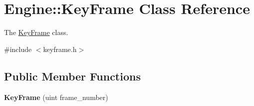 \hypertarget{classEngine_1_1KeyFrame}{}\section{Engine\+:\+:Key\+Frame Class Reference}
\label{classEngine_1_1KeyFrame}


The \hyperlink{classEngine_1_1KeyFrame}{Key\+Frame} class.  




{\ttfamily \#include $<$keyframe.\+h$>$}

\subsection*{Public Member Functions}
\begin{DoxyCompactItemize}
\item 
\hypertarget{classEngine_1_1KeyFrame_a63ec3bece671c76f3df227a16fba2a0d}{}{\bfseries Key\+Frame} (uint frame\+\_\+number)\label{classEngine_1_1KeyFrame_a63ec3bece671c76f3df227a16fba2a0d}


\end{DoxyCompactItemize}
